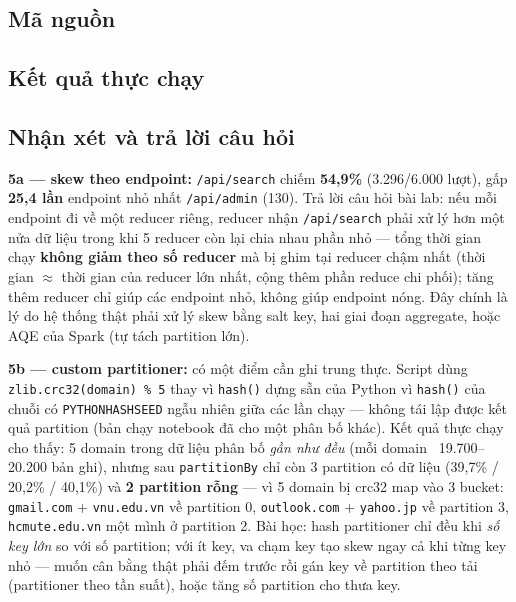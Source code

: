 \documentclass[12pt,a4paper,oneside]{article}
\begin{document}
\subsection{Mã nguồn}



\subsection{Kết quả thực chạy}



\subsection{Nhận xét và trả lời câu hỏi}

\textbf{5a --- skew theo endpoint:} \texttt{/api/search} chiếm \textbf{54,9\%} (3.296/6.000 lượt), gấp \textbf{25,4 lần} endpoint nhỏ nhất \texttt{/api/admin} (130). Trả lời câu hỏi bài lab: nếu mỗi endpoint đi về một reducer riêng, reducer nhận \texttt{/api/search} phải xử lý hơn một nửa dữ liệu trong khi 5 reducer còn lại chia nhau phần nhỏ --- tổng thời gian chạy \textbf{không giảm theo số reducer} mà bị ghim tại reducer chậm nhất (thời gian $\approx$ thời gian của reducer lớn nhất, cộng thêm phần reduce chi phối); tăng thêm reducer chỉ giúp các endpoint nhỏ, không giúp endpoint nóng. Đây chính là lý do hệ thống thật phải xử lý skew bằng salt key, hai giai đoạn aggregate, hoặc AQE của Spark (tự tách partition lớn).

\textbf{5b --- custom partitioner:} có một điểm cần ghi trung thực. Script dùng \texttt{zlib.crc32(domain) \% 5} thay vì \texttt{hash()} dựng sẵn của Python vì \texttt{hash()} của chuỗi có \texttt{PYTHONHASHSEED} ngẫu nhiên giữa các lần chạy --- không tái lập được kết quả partition (bản chạy notebook đã cho một phân bố khác). Kết quả thực chạy cho thấy: 5 domain trong dữ liệu phân bố \emph{gần như đều} (mỗi domain ~19.700--20.200 bản ghi), nhưng sau \texttt{partitionBy} chỉ còn 3 partition có dữ liệu (39,7\% / 20,2\% / 40,1\%) và \textbf{2 partition rỗng} --- vì 5 domain bị crc32 map vào 3 bucket: \texttt{gmail.com} + \texttt{vnu.edu.vn} về partition 0, \texttt{outlook.com} + \texttt{yahoo.jp} về partition 3, \texttt{hcmute.edu.vn} một mình ở partition 2. Bài học: hash partitioner chỉ đều khi \emph{số key lớn} so với số partition; với ít key, va chạm key tạo skew ngay cả khi từng key nhỏ --- muốn cân bằng thật phải đếm trước rồi gán key về partition theo tải (partitioner theo tần suất), hoặc tăng số partition cho thưa key.
\end{document}
